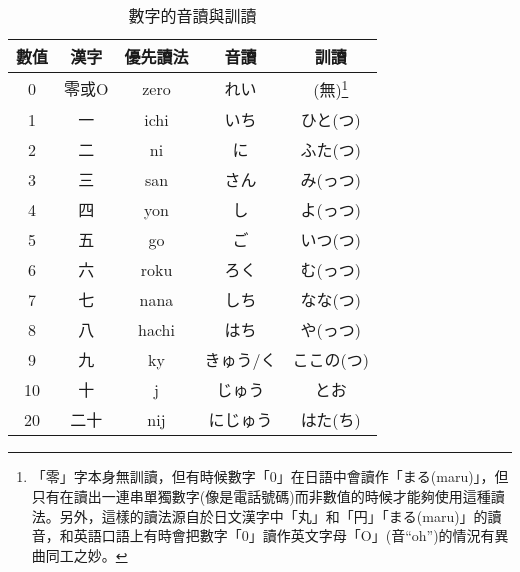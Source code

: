 \documentclass[12pt]{article}
\begin{document}
\begin{CJK}{UTF8}{cybercjk}
\begin{longtable}{ccccc}
\caption{數字的音讀與訓讀}\\
數值 & 	漢字 &	優先讀法 & 音讀 & 訓讀\\
\hline
\begin{comment}
\end{comment}
0 &	零或O & zero &	れい &	(無)\footnote{「零」字本身無訓讀，但有時候數字「0」在日語中會讀作「まる(maru)」，但只有在讀出一連串單獨數字(像是電話號碼)而非數值的時候才能夠使用這種讀法。另外，這樣的讀法源自於日文漢字中「丸」和「円」「まる(maru)」的讀音，和英語口語上有時會把數字「0」讀作英文字母「O」(音``oh'')的情況有異曲同工之妙。} \\
\hline
1 &	一 &	ichi &	いち  &	ひと(つ)\\
\hline
2 &	二 &	ni &	に &	ふた(つ)\\
\hline
3 &	三 &	san &	さん &	み(っつ)\\
\hline
4 &	四 &	yon &	し &	よ(っつ)\\
\hline
5 &	五 &	go &	ご &	いつ(つ)\\
\hline
6 &	六 &	roku &	ろく  &	む(っつ)\\
\hline
7 &	七 &	nana &	しち  &	なな(つ)\\
\hline
8 &	八 &	hachi &	はち  &	や(っつ)\\
\hline
9 &	九 &	ky &	きゅう/く   &	ここの(つ)\\
\hline
10 &	十 &	j &	じゅう &	とお\\
\hline
20 &	二十 &	nij &	にじゅう &	はた(ち)\\
\hline

\end{longtable}





\end{CJK}
\end{document}
